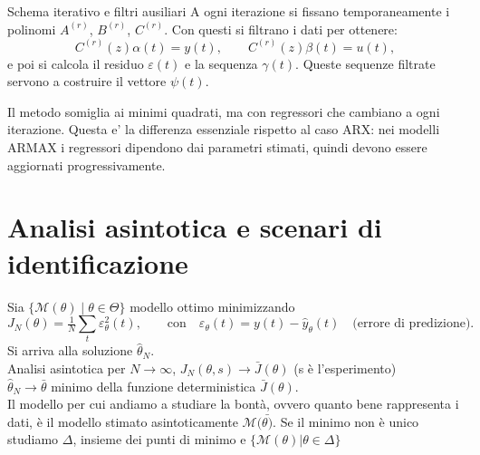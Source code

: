 \documentclass[11pt,a4paper]{article}
\begin{document}
\begin{spiegazione}{Schema iterativo e filtri ausiliari}
A ogni iterazione si fissano temporaneamente i polinomi $A^{(r)}$, $B^{(r)}$, $C^{(r)}$. Con questi si filtrano i dati per ottenere:
\[
C^{(r)}(z)\alpha(t)=y(t),\qquad
C^{(r)}(z)\beta(t)=u(t),
\]
e poi si calcola il residuo $\varepsilon(t)$ e la sequenza $\gamma(t)$. Queste sequenze filtrate servono a costruire il vettore $\psi(t)$.

Il metodo somiglia ai minimi quadrati, ma con regressori che cambiano a ogni iterazione. Questa e' la differenza essenziale rispetto al caso ARX: nei modelli ARMAX i regressori dipendono dai parametri stimati, quindi devono essere aggiornati progressivamente.
\end{spiegazione}

\section{Analisi asintotica e scenari di identificazione}

Sia $\{\mathcal{M}(\theta)\mid \theta\in\Theta\}$ modello ottimo minimizzando
\[
J_N(\theta)=\tfrac{1}{N}\sum_t\varepsilon_\theta^2(t),\qquad \text{con} \quad \varepsilon_\theta(t)=y(t)-\hat y_\theta(t)\quad \text{(errore di predizione)}.
\]
Si arriva alla soluzione $\hat{\theta}_N$.\\
Analisi asintotica per $N\to\infty$, $J_N(\theta,s)\to \bar J(\theta)$ (s è l'esperimento)\\
$\hat{\theta}_N \rightarrow \bar{\theta}$ minimo della funzione deterministica $\bar{J}(\theta)$.\\
Il modello per cui andiamo a studiare la bontà, ovvero quanto bene rappresenta i dati, è il modello stimato asintoticamente $\mathcal{M(\bar{\theta)}}$. Se il minimo non è unico studiamo $\Delta$, insieme dei punti di minimo e $\{\mathcal{M(\theta)}|\theta\in\Delta\}$
\end{document}
